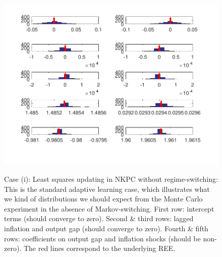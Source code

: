 \documentclass[12pt,reqno]{article}
\numberwithin{equation}{section}
\begin{document}
\begin{figure}[H]
\caption{Case (i): Least squares updating in NKPC without regime-switching: This is the standard adaptive learning case, which illustrates what we kind of distributions we should expect from the Monte Carlo experiment in the absence of Markov-switching. First row: intercept terms (should converge to zero). Second \& third rows: lagged inflation and output gap (should converge to zero). Fourth \& fifth rows: coefficients on output gap and inflation shocks (should be non-zero). The red lines correspond to the underlying REE.  }

\includegraphics[scale=1.2]{MC_MSV_withoutLags.pdf}\\
\end{figure}

\newpage
\end{document}
